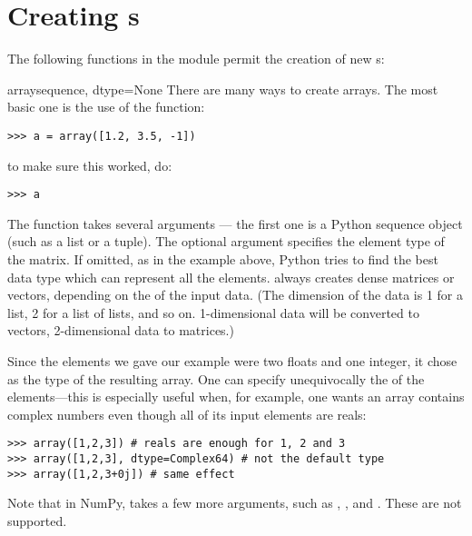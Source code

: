 \section{Creating s}

The following functions in the module  permit
the creation of new s:

\begin{funcdesc}{array}{sequence, dtype=None}
   There are many ways to create arrays. The most basic one is the use of the
    function:
\begin{verbatim}
>>> a = array([1.2, 3.5, -1])
\end{verbatim}
   to make sure this worked, do:
\begin{verbatim}
>>> a
\end{verbatim}
   The  function takes several arguments --- the first
   one is a Python sequence object (such as a list or a tuple).  The
   optional argument  specifies the element type of the
   matrix. If omitted, as in the example above, Python tries to find
   the best data type which can represent all the
   elements.  always creates dense matrices or
   vectors, depending on the  of
   the input data.  (The dimension of the data is 1 for a list, 2 for
   a list of lists, and so on.  1-dimensional data will be converted
   to vectors, 2-dimensional data to matrices.)
   
   Since the elements we gave our example were two floats and one integer, it
   chose  as the type of the resulting array. One can specify
   unequivocally the  of the elements---this is especially 
   useful when, for example, one wants an array contains complex numbers even
   though all of its input elements are reals:
\begin{verbatim}
>>> array([1,2,3]) # reals are enough for 1, 2 and 3
>>> array([1,2,3], dtype=Complex64) # not the default type
>>> array([1,2,3+0j]) # same effect
\end{verbatim}
    Note that in NumPy,  takes a few more arguments, such as
    , , and . These are not supported.
\end{funcdesc}

